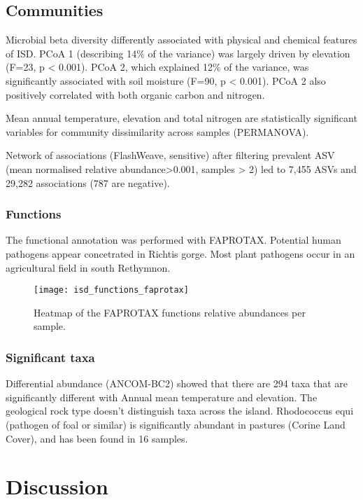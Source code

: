 \subsection{Communities}\label{communities}
Microbial beta diversity differently associated with physical and chemical
features of ISD. PCoA 1 (describing 14\% of the variance) was largely driven by
elevation (F=23, p < 0.001). PCoA 2, which explained 12\% of the variance,
was significantly associated with soil moisture (F=90, p < 0.001).
PCoA 2 also positively correlated with both organic carbon and nitrogen.

Mean annual temperature, elevation and total nitrogen are statistically significant variables for
community dissimilarity across samples (PERMANOVA).

Network of associations (FlashWeave, sensitive) after filtering prevalent ASV (mean normalised relative
abundance>0.001, samples > 2) led to 7,455 ASVs and
29,282 associations (787 are negative).

\subsubsection{Functions}\label{functions}
The functional annotation was performed with FAPROTAX. Potential human pathogens 
appear concetrated in Richtis gorge. Most plant pathogens occur in an agricultural 
field in south Rethymnon. 

\begin{figure}[t] 
    \centering\texttt{[image: isd\_functions\_faprotax]}
\caption{Heatmap of the FAPROTAX functions relative abundances per sample.}
    \label{fig:isd_functions_faprotax}
\end{figure}

\subsubsection{Significant taxa}\label{sig_taxa}
Differential abundance (ANCOM-BC2) showed that there are 294 taxa that are significantly different
with Annual mean temperature and elevation. The geological rock type doesn't distinguish taxa
across the island. Rhodococcus equi (pathogen of foal or similar) is significantly abundant in
pastures (Corine Land Cover), and has been found in 16 samples.

\section{Discussion}\label{discussion}


